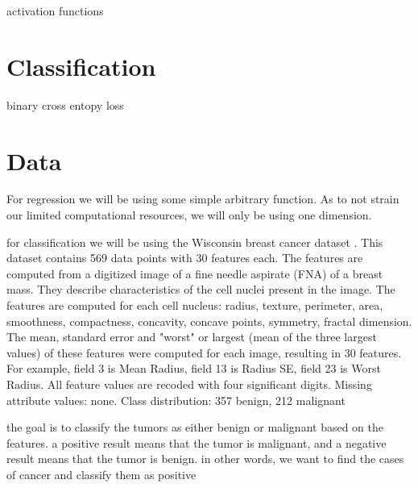 \documentclass[twoside,11pt]{report}
\begin{document}
activation functions


\section{Classification}

binary cross entopy loss





\section{Data}
\label{sec:data}

For regression we will be using some simple arbitrary function. As to not strain our limited computational resources,
we will only be using one dimension. 

for classification we will be using the Wisconsin breast cancer dataset \cite{wdbc}. This dataset contains 569 data points
with 30 features each. The features are computed from a digitized image of a fine needle aspirate (FNA) of a breast mass.
They describe characteristics of the cell nuclei present in the image. The features are computed for each cell nucleus:
radius, texture, perimeter, area, smoothness, compactness, concavity, concave points, symmetry, fractal dimension.
The mean, standard error and "worst" or largest (mean of the three largest values) of these features were computed for each image,
resulting in 30 features. For example, field 3 is Mean Radius, field 13 is Radius SE, field 23 is Worst Radius.
All feature values are recoded with four significant digits. Missing attribute values: none.
Class distribution: 357 benign, 212 malignant

the goal is to classify the tumors as either benign or malignant based on the features.
a positive result means that the tumor is malignant, and a negative result means that the tumor is benign.
in other words, we want to find the cases of cancer and classify them as positive
\end{document}
